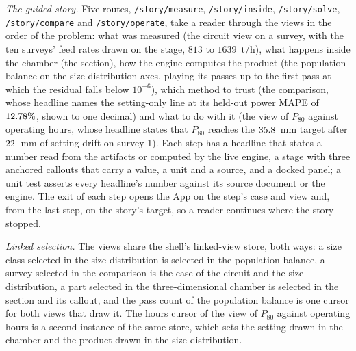 \emph{The guided story.} Five routes, \texttt{/story/\allowbreak{}measure}, \texttt{/story/\allowbreak{}inside}, \texttt{/story/\allowbreak{}solve},
\texttt{/story/\allowbreak{}compare} and \texttt{/story/\allowbreak{}operate}, take a reader through the views in the order of the problem: what was measured (the circuit view on a survey, with
the ten surveys' feed rates drawn on the stage, $813$ to $1639$~t/h), what happens inside the chamber (the section), how the engine
computes the product (the population balance on the size-distribution axes, playing its passes up to the first pass at which the
residual falls below $10^{-6}$), which method to trust (the comparison, whose headline names the setting-only line at its held-out power MAPE of $12.78\%$,
shown to one decimal) and what to do with it (the view of $P_{80}$ against operating hours, whose headline states that $P_{80}$ reaches the
$35.8$~mm target after $22$~mm of setting drift on survey 1). Each step has a headline that states a number read
from the artifacts or computed by the live engine, a stage with three anchored callouts that carry a value, a unit and a source, and a
docked panel; a unit test asserts every headline's number against its source document or the engine. The exit of each step opens the
App on the step's case and view and, from the last step, on the story's target, so a reader continues where the story stopped.

\emph{Linked selection.} The views share the shell's linked-view store, both ways: a size class selected in the size distribution is
selected in the population balance, a survey selected in the comparison is the case of the circuit and the size distribution, a part
selected in the three-dimensional chamber is selected in the section and its callout, and the pass count of the population balance is
one cursor for both views that draw it. The hours cursor of the view of $P_{80}$ against operating hours is a second instance of the same store, which sets the
setting drawn in the chamber and the product drawn in the size distribution.

